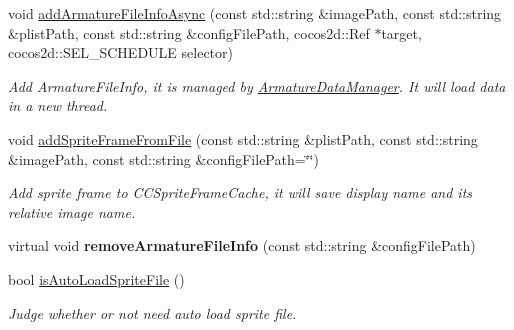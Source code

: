 \begin{DoxyCompactItemize}
\mbox{\label{classcocostudio_1_1ArmatureDataManager_ae4bd5cc9b48209df7869dc027c5d2550}} 
void \hyperlink{classcocostudio_1_1ArmatureDataManager_ae4bd5cc9b48209df7869dc027c5d2550}{add\+Armature\+File\+Info\+Async} (const std\+::string \&image\+Path, const std\+::string \&plist\+Path, const std\+::string \&config\+File\+Path, cocos2d\+::\+Ref $\ast$target, cocos2d\+::\+S\+E\+L\+\_\+\+S\+C\+H\+E\+D\+U\+LE selector)
\begin{DoxyCompactList}\small\item\em Add Armature\+File\+Info, it is managed by \hyperlink{classcocostudio_1_1ArmatureDataManager}{Armature\+Data\+Manager}. It will load data in a new thread. \end{DoxyCompactList}\item 
\mbox{\label{classcocostudio_1_1ArmatureDataManager_aa878105ec4cd7dbfb415864a13bd908e}} 
void \hyperlink{classcocostudio_1_1ArmatureDataManager_aa878105ec4cd7dbfb415864a13bd908e}{add\+Sprite\+Frame\+From\+File} (const std\+::string \&plist\+Path, const std\+::string \&image\+Path, const std\+::string \&config\+File\+Path=\char`\"{}\char`\"{})
\begin{DoxyCompactList}\small\item\em Add sprite frame to C\+C\+Sprite\+Frame\+Cache, it will save display name and it\textquotesingle{}s relative image name. \end{DoxyCompactList}\item 
\mbox{\label{classcocostudio_1_1ArmatureDataManager_a1d705c75c9b7c7f1b26d2120286a9a40}} 
virtual void {\bfseries remove\+Armature\+File\+Info} (const std\+::string \&config\+File\+Path)
\item 
\mbox{\label{classcocostudio_1_1ArmatureDataManager_af799c20a271544234f00a85d380d9d75}} 
bool \hyperlink{classcocostudio_1_1ArmatureDataManager_af799c20a271544234f00a85d380d9d75}{is\+Auto\+Load\+Sprite\+File} ()
\begin{DoxyCompactList}\small\item\em Judge whether or not need auto load sprite file. \end{DoxyCompactList}\item 
\mbox{\label{classcocostudio_1_1ArmatureDataManager_ab89cdbf94e009af2ae4861d486dbc85d}} 

\end{DoxyCompactItemize}
